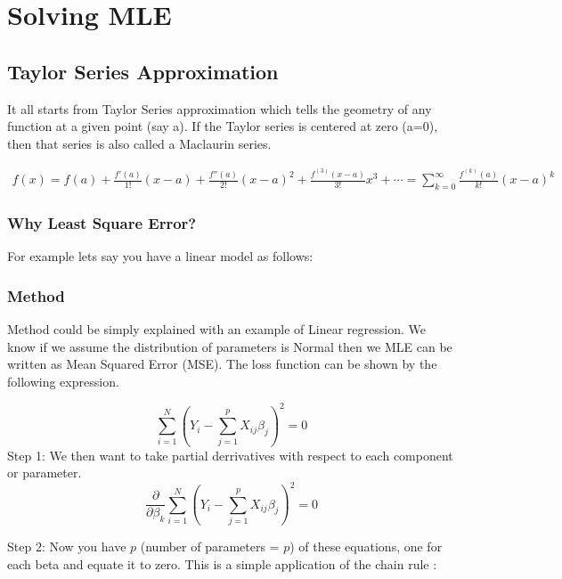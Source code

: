 \chapter{Solving MLE}

\section{Taylor Series Approximation}

It all starts from Taylor Series approximation which tells the geometry of any function at a given point (say a). If the Taylor series is centered at zero (a=0), then that series is also called a Maclaurin series. 

\begin{equation}
\begin{split}
f(x) = f(a) + \frac{f'(a)}{1!}(x-a) + \frac{f''(a)}{2!}(x-a)^2 + \frac{f^{(3)}(x-a)}{3!}x^3 + \dotsb = \sum_{k=0}^\infty \frac{f^{\left(k\right)}(a)}{k!} (x-a)^k
\end{split}
\end{equation}

  
\subsection{Why Least Square Error?}
For example lets say you have a linear model as follows: 


\subsection{Method}
Method could be simply explained with an example of Linear regression. 
We know if we assume the distribution of parameters is Normal then we MLE can be written as Mean Squared Error (MSE). The loss function can be shown by the following expression. 

\begin{equation}
    \sum_{i=1}^{N}\left(Y_{i}-\sum_{j=1}^{p}X_{ij}\beta_{j}\right)^{2}=0
\end{equation}
\noindent Step 1: We then want to take partial derrivatives with respect to each component or parameter. 
\begin{equation}
    \frac{\partial}{\partial \beta_{k}}\sum_{i=1}^{N}\left(Y_{i}-\sum_{j=1}^{p}X_{ij}\beta_{j}\right)^{2}=0
\end{equation}

\noindent Step 2: Now you have $p$ (number of parameters = $p$) of these equations, one for each beta and equate it to zero. This is a simple application of the chain rule \cite{mse-eq}:

